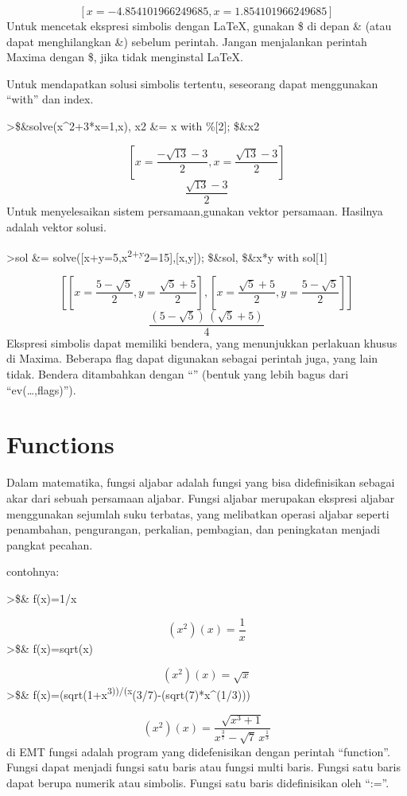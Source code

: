 \documentclass[
]{book}
\begin{document}
\[\left[ x=-4.854101966249685 , x=1.854101966249685 \right] \]Untuk mencetak ekspresi simbolis dengan LaTeX, gunakan \$ di depan \& (atau dapat menghilangkan \&) sebelum perintah. Jangan menjalankan perintah Maxima dengan \$, jika tidak menginstal LaTeX.

Untuk mendapatkan solusi simbolis tertentu, seseorang dapat menggunakan ``with'' dan index.

\textgreater\$\&solve(x\^{}2+3*x=1,x), x2 \&= x with \%{[}2{]}; \$\&x2

\[\left[ x=\frac{-\sqrt{13}-3}{2} , x=\frac{\sqrt{13}-3}{2} \right] \]\[\frac{\sqrt{13}-3}{2}\]Untuk menyelesaikan sistem persamaan,gunakan vektor persamaan. Hasilnya adalah vektor solusi.

\textgreater sol \&= solve({[}x+y=5,x\textsuperscript{2+y}2=15{]},{[}x,y{]}); \$\&sol, \$\&x*y with sol{[}1{]}

\[\left[ \left[ x=\frac{5-\sqrt{5}}{2} , y=\frac{\sqrt{5}+5}{2}
  \right]  , \left[ x=\frac{\sqrt{5}+5}{2} , y=\frac{5-\sqrt{5}}{2}
  \right]  \right] \]\[\frac{\left(5-\sqrt{5}\right)\,\left(\sqrt{5}+5\right)}{4}\]Ekspresi simbolis dapat memiliki bendera, yang menunjukkan perlakuan khusus di Maxima. Beberapa flag dapat digunakan sebagai perintah juga, yang lain tidak. Bendera ditambahkan dengan ``\textbar{}'' (bentuk yang lebih bagus dari ``ev(\ldots,flags)'').

\section{Functions}\label{functions}

Dalam matematika, fungsi aljabar adalah fungsi yang bisa didefinisikan sebagai akar dari sebuah persamaan aljabar. Fungsi aljabar merupakan ekspresi aljabar menggunakan sejumlah suku terbatas, yang melibatkan operasi aljabar seperti penambahan, pengurangan, perkalian, pembagian, dan peningkatan menjadi pangkat pecahan.

contohnya:

\textgreater\$\& f(x)=1/x

\[\left(x^2\right)(x)=\frac{1}{x}\]\textgreater\$\& f(x)=sqrt(x)

\[\left(x^2\right)(x)=\sqrt{x}\]\textgreater\$\& f(x)=(sqrt(1+x\textsuperscript{3))/(x}(3/7)-(sqrt(7)*x\^{}(1/3)))

\[\left(x^2\right)(x)=\frac{\sqrt{x^3+1}}{x^{\frac{3}{7}}-\sqrt{7}\,x
 ^{\frac{1}{3}}}\]di EMT fungsi adalah program yang didefenisikan dengan perintah ``function''. Fungsi dapat menjadi fungsi satu baris atau fungsi multi baris. Fungsi satu baris dapat berupa numerik atau simbolis. Fungsi satu baris didefinisikan oleh ``:=''.
\end{document}
